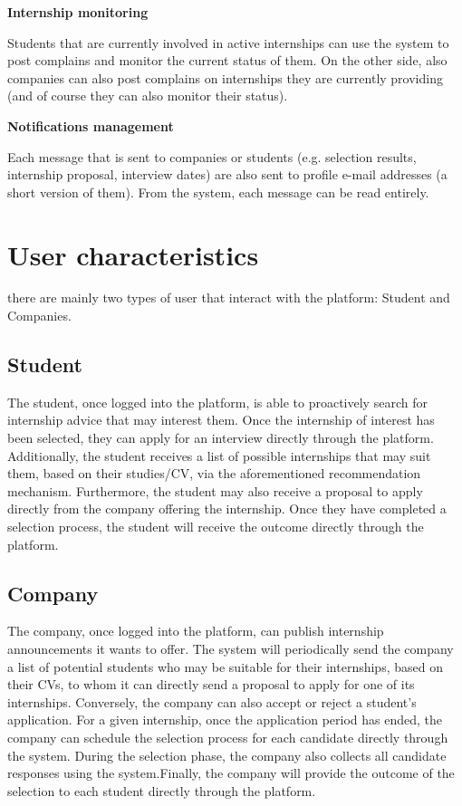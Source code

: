 		\textbf{Internship monitoring}
			\begin{flushleft}
				Students that are currently involved in active internships can use the system to post complains and monitor the current status of them. On the other side, also companies can also post complains on internships they are currently providing (and of course they can also monitor their status).
			\end{flushleft}
		\textbf{Notifications management}
			\begin{flushleft}
				Each message that is sent to companies or students (e.g. selection results, internship proposal, interview dates) are also sent to profile e-mail addresses (a short version of them). From the system, each message can be read entirely.
			\end{flushleft}
	\section{User characteristics}
		there are mainly two types of user that interact with the platform: Student and Companies.
		\subsection{Student}
			The student, once logged into the platform, is able to proactively search for internship advice that may interest them. Once the internship of interest has been selected, they can apply for an interview directly through the platform. Additionally, the student receives a list of possible internships that may suit them, based on their studies/CV, via the aforementioned recommendation mechanism. Furthermore, the student may also receive a proposal to apply directly from the company offering the internship. Once they have completed a selection process, the student will receive the outcome directly through the platform.
		
		\subsection{Company}
			The company, once logged into the platform, can publish internship announcements it wants to offer. The system will periodically send the company a list of potential students who may be suitable for their internships, based on their CVs, to whom it can directly send a proposal to apply for one of its internships. Conversely, the company can also accept or reject a student's application. For a given internship, once the application period has ended, the company can schedule the selection process for each candidate directly through the system. During the selection phase, the company also collects all candidate responses using the system.Finally, the company will provide the outcome of the selection to each student directly through the platform.
		
